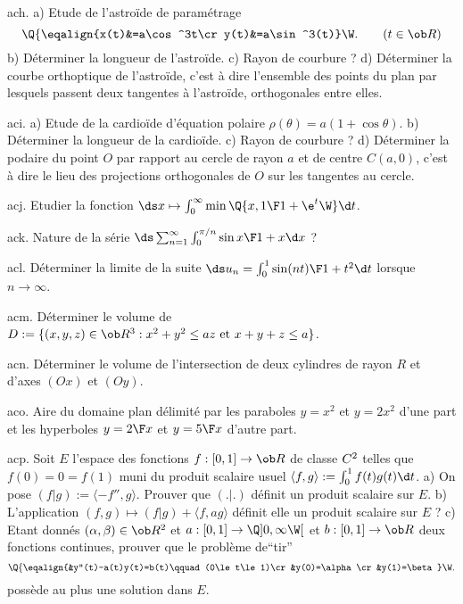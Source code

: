 \exo [Level=2,Fight=2,Learn=1,Field=\RepèreDeFrenet,Type=\Exercices,Origin=\MP] ach. 
a) Etude de l'astro\"ide de paramétrage
$$
\Q\{\eqalign{x(t)&=a\cos^3t\cr y(t)&=a\sin^3(t)}\W.\qquad(t\in\ob R)
$$
b) Déterminer la longueur de l'astroïde. \pn 
c) Rayon de courbure ? \pn
d) Déterminer la courbe orthoptique de l'astro\" ide, c'est à dire l'ensemble des points du plan 
par lesquels passent deux tangentes à l'astroïde, orthogonales entre elles. 

\exo [Level=2,Fight=2,Learn=1,Field=\RepèreDeFrenet,Type=\Exercices,Origin=\MP] aci. 
a) Etude de la cardioïde d'équation polaire $\rho(\theta)=a(1+\cos\theta)$. \pn
b) Déterminer la longueur de la cardioïde. \pn
c) Rayon de courbure ?\pn
d) Déterminer la podaire du point $O$ par rapport au cercle de rayon $a$ et de centre $C(a,0)$, 
c'est à dire le lieu des projections orthogonales de $O$ sur les tangentes au cercle. 

\exo [Level=2,Fight=1,Learn=1,Field=\FonctionsDéfiniesParUneIntégrale,Type=\Exercices,Origin=] acj. 
Etudier la fonction $\ds x\mapsto \int_0^\infty\min\Q\{x,{1\F1+\e^t}\W\}\d t$. 

\exo [Level=2,Fight=2,Learn=1,Field=\Séries,Type=\Exercices,Origin=] ack. 
Nature de la série $\ds\sum_{n=1}^\infty\int_0^{\pi/n}{\sin x\F1+x}\d x$ ?

\exo [Level=2,Fight=2,Learn=1,Field=\FonctionsDéfiniesParUneIntégrale,Type=\Exercices,Origin=] acl. 
Déterminer la limite de la suite $\ds u_n=\int_0^1{\sin (n t)\F 1+t^2}\d t$ lorsque $n\to\infty$. 

\exo [Level=2,Fight=1,Learn=1,Field=\Volumes,Type=\Exercices,Origin=] acm. 
Déterminer le volume de $D:=\{(x,y,z)\in\ob R^3:x^2+y^2\le az\hbox{ et }x+y+z\le a\}$. 

\exo [Level=2,Fight=1,Learn=1,Field=\Volumes,Type=\Exercices,Origin=] acn. 
Déterminer le volume de l'intersection de deux cylindres de rayon $R$ 
et d'axes $(Ox)$ et $(Oy)$. 

\exo [Level=2,Fight=1,Learn=1,Field=\Aires,Type=\Exercices,Origin=] aco. 
Aire du domaine plan délimité par les paraboles $y=x^2$ et $y=2x^2$ d'une part 
et les hyperboles $y={2\F x}$ et $y={5\F x}$ d'autre part. 

\exo [Level=1,Fight=2,Learn=1,Field=\EspacesPréHilbertiens,Type=\Exercices,Origin=] acp. 
Soit $E$ l'espace des fonctions $f:[0,1]\to \ob R$ de classe $\sc C^2$ telles que $f(0)=0=f(1)$ muni du produit scalaire usuel 
$\langle f,g\rangle:=\int_0^1f(t)g(t)\d t$. \pn
a) On pose $(f|g):=\langle-f'',g\rangle$. Prouver que $(.|.)$ définit un produit scalaire sur $E$.  \pn
b) L'application $(f,g)\mapsto(f|g)+\langle f,ag\rangle$ définit elle un produit scalaire sur $E$ ?\pn
c) Etant donnés $(\alpha,\beta)\in\ob R^2$ et $a:[0,1]\to\Q]0,\infty\W[$ et $b:[0,1]\to\ob R$ 
deux fonctions continues, prouver que le problème de``tir''
$$
\Q\{\eqalign{&y''(t)-a(t)y(t)=b(t)\qquad(0\le t\le 1)\cr&y(0)=\alpha\cr&y(1)=\beta}
\W.
$$
possède au plus une solution dans $E$. 

